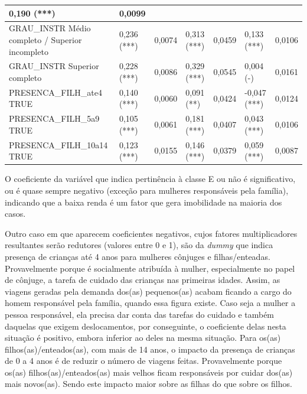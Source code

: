 \begin{landscape}
\begin{table}[htb]
{\begin{tabular}{P{6.00cm} P{2.5cm} P{2.0cm} P{2.5cm} P{2.0cm} P{2.5cm} P{2.0cm}}
				0,190 (***)&
				0,0099\\	
			\midrule
				GRAU\_INSTR Médio completo / Superior incompleto& 
				0,236 (***)&
				0,0074&
				0,313 (***)&
				0,0459&				
				0,133 (***)&
				0,0106\\	
			\midrule
				GRAU\_INSTR Superior completo& 
				0,228 (***)&
				0,0086&
				0,329 (***)&
				0,0545&				
				0,004 (-)&
				0,0161\\	
			\midrule
				PRESENCA\_FILH\_ate4 TRUE& 
				0,140 (***)&
				0,0060&
				0,091 (**)&
				0,0424&				
				-0,047 (***)&
				0,0124\\	
			\midrule
				PRESENCA\_FILH\_5a9 TRUE& 
				0,105 (***)&
				0,0061&
				0,181 (***)&
				0,0407&				
				0,043 (***)&
				0,0106\\	
			\midrule
				PRESENCA\_FILH\_10a14 TRUE& 
				0,123 (***)&
				0,0155&
				0,146 (***)&
				0,0379&				
				0,059 (***)&
				0,0087\\	
			\bottomrule	
		\end{tabular}
    }{%
	}
\end{table}
\end{landscape}

\clearpage
O coeficiente da variável que indica pertinência à classe E ou não é significativo, ou é quase sempre negativo (exceção para mulheres responsáveis pela família), indicando que a baixa renda é um fator que gera imobilidade na maioria dos casos.

Outro caso em que aparecem coeficientes negativos, cujos fatores multiplicadores resultantes serão redutores (valores entre 0 e 1), são da \textit{dummy} que indica presença de crianças até 4 anos para mulheres cônjuges e filhas/enteadas. 
Provavelmente porque é socialmente atribuída à mulher, especialmente no papel de cônjuge, a tarefa de cuidado das crianças nas primeiras idades.
Assim, as viagens geradas pela demanda dos(as) pequenos(as) acabam ficando a cargo do homem responsável pela família, quando essa figura existe. 
Caso seja a mulher a pessoa responsável, ela precisa dar conta das tarefas do cuidado e também daquelas que exigem deslocamentos, por conseguinte, o coeficiente delas nesta situação é positivo, embora inferior ao deles na mesma situação.
Para os(as) filhos(as)/enteados(as), com mais de 14 anos, o impacto da presença de crianças de 0 a 4 anos é de reduzir o número de viagens feitas. Provavelmente porque os(as) filhos(as)/enteados(as) mais velhos ficam responsáveis por cuidar dos(as) mais novos(as).
Sendo este impacto maior sobre as filhas do que sobre os filhos.

